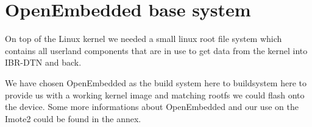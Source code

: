 \section{OpenEmbedded base system}
On top of the Linux kernel we needed a small linux root file system which
contains all userland components that are in use to get data from the kernel
into IBR-DTN and back.

We have chosen OpenEmbedded as the build system here to buildsystem here to
provide us with a working kernel image and matching rootfs we could flash onto
the device. Some more informations about OpenEmbedded and our use on the Imote2
could be found in the annex.

